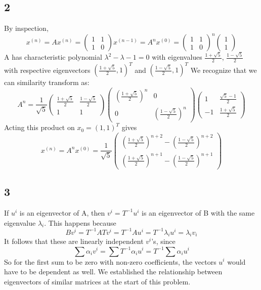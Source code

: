 \documentclass{article}
\begin{document}
\subsection*{2}
By inspection,
$$x^{(n)} = Ax^{(n)} = \begin{pmatrix}1&1\\1&0\end{pmatrix}x^{(n-1)} = A^nx^{(0)}=\begin{pmatrix}1&1\\1&0\end{pmatrix}^n\begin{pmatrix}1\\1\end{pmatrix}$$
A has characteristic polynomial $\lambda^2-\lambda-1=0$ with eigenvalues $\frac{1+\sqrt{5}}{2}$, $\frac{1-\sqrt{5}}{2}$ with respective eigenvectors $(\frac{1+\sqrt{5}}{2},1)^T$ and $(\frac{1-\sqrt{5}}{2},1)^T$
We recognize that we can similarity transform as:
$$A^n = \frac{1}{\sqrt{5}}\begin{pmatrix}\frac{1+\sqrt{5}}{2}&\frac{1-\sqrt{5}}{2}\\1&1\end{pmatrix}\begin{pmatrix}(\frac{1+\sqrt{5}}{2})^n&0\\0&(\frac{1-\sqrt{5}}{2})^n\end{pmatrix}\begin{pmatrix}1&\frac{\sqrt{5}-1}{2}\\-1&\frac{1+\sqrt{5}}{2}\end{pmatrix}$$
Acting this product on $x_0 = (1,1)^T$ gives
$$x^{(n)} = A^nx^{(0)} = \frac{1}{\sqrt{5}}\begin{pmatrix}(\frac{1+\sqrt{5}}{2})^{n+2}- (\frac{1-\sqrt{5}}{2})^{n+2}\\ (\frac{1+\sqrt{5}}{2})^{n+1} - (\frac{1-\sqrt{5}}{2})^{n+1}\end{pmatrix}$$
\subsection*{3}
If $u^i$ is an eigenvector of A, then $v^i = T^{-1}u^i$ is an eigenvector of B with the same eigenvalue $\lambda_i$.  This happens because 
$$Bv^i = T^{-1}ATv^i = T^{-1}Au^i = T^{-1}\lambda_i u^i = \lambda_i v_i$$
It follows that these are linearly independent $v^i$'s, since
$$\sum \alpha_i v^i=\sum T^{-1}\alpha_iu^i = T^{-1}\sum\alpha_iu^i$$
So for the first sum to be zero with non-zero coefficients, the vectors $u^i$ would have to be dependent as well.  We established the relationship between eigenvectors of similar matrices at the start of this problem.
\end{document}
